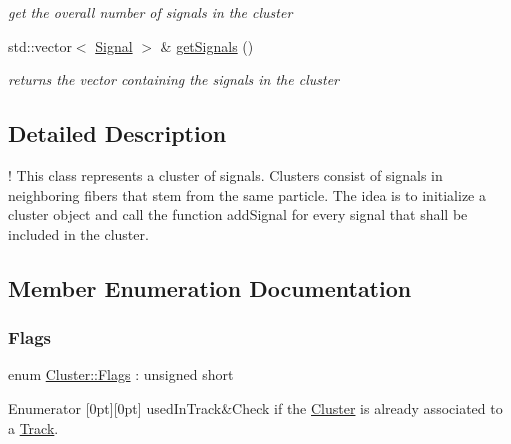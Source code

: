 \begin{DoxyCompactItemize}
\begin{DoxyCompactList}\small\item\em get the overall number of signals in the cluster \end{DoxyCompactList}\item 
\mbox{\label{classCluster_ac76ad4f0d6b3db83e39364063e864a0c}} 
std\+::vector$<$ \hyperlink{classSignal}{Signal} $>$ \& \hyperlink{classCluster_ac76ad4f0d6b3db83e39364063e864a0c}{get\+Signals} ()
\begin{DoxyCompactList}\small\item\em returns the vector containing the signals in the cluster \end{DoxyCompactList}\end{DoxyCompactItemize}


\subsection{Detailed Description}
! This class represents a cluster of signals. Clusters consist of signals in neighboring fibers that stem from the same particle. The idea is to initialize a cluster object and call the function add\+Signal for every signal that shall be included in the cluster. 

\subsection{Member Enumeration Documentation}
\mbox{\label{classCluster_a161820c1803e25a96fb5075c63828451}} 
\subsubsection{\texorpdfstring{Flags}{Flags}}
{\footnotesize\ttfamily enum \hyperlink{classCluster_a161820c1803e25a96fb5075c63828451}{Cluster\+::\+Flags} \+: unsigned short}

\begin{DoxyEnumFields}{Enumerator}
[0pt][0pt]{}\mbox{\label{classCluster_a161820c1803e25a96fb5075c63828451a07b5d8988299b30135aecdb9cf48d0c5}} 
used\+In\+Track&Check if the \hyperlink{classCluster}{Cluster} is already associated to a \hyperlink{classTrack}{Track}. \\
\hline

\end{DoxyEnumFields}


